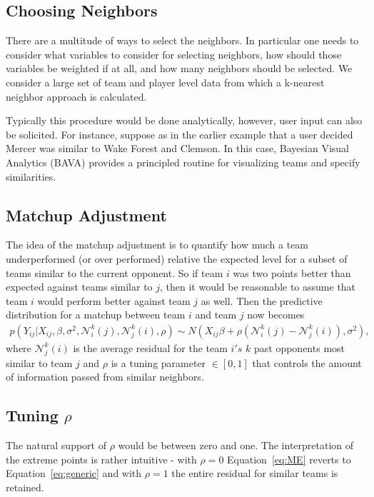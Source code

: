 \subsection{Choosing Neighbors}
There are a multitude of ways to select the neighbors.  In particular one needs to consider what variables to consider for selecting neighbors, how should those variables be weighted if at all, and how many neighbors should be selected.  We consider a large set of team and player level data from which a k-nearest neighbor approach is calculated.

Typically this procedure would be done analytically, however, user input can also be solicited.  For instance, suppose as in the earlier example that a user decided Mercer was similar to Wake Forest and Clemson.  In this case, Bayesian Visual Analytics (BAVA) provides a principled routine for visualizing teams and specify similarities.
\subsection{Matchup Adjustment}
The idea of the matchup adjustment is to quantify how much a team underperformed (or over performed) relative the expected level for a subset of teams similar to the current opponent.  So if team $i$ was two points better than expected against teams similar to $j$, then it would be reasonable to assume that team $i$ would perform better against team $j$ as well.  Then the predictive distribution for a matchup between team $i$ and team $j$ now becomes
\begin{eqnarray}
p(Y_{ij}|X_{ij}, \beta,\sigma^2,\mathcal{N}_i^k(j),\mathcal{N}_j^k(i), \rho) \sim N(X_{ij} \beta + \rho(\mathcal{N}_i^k(j) -\mathcal{N}_j^k(i)), \sigma^2),
\label{eq:ME}
\end{eqnarray}
where $\mathcal{N}_j^k(i)$ is the average residual for the team $i's$ $k$ past opponents most similar to team $j$ and $\rho$ is a tuning parameter $\in [0,1]$ that controls the amount of information passed from similar neighbors. 
\subsection{Tuning $\rho$}
The natural support of $\rho$ would be between zero and one.  The interpretation of the extreme points is rather intuitive - with $\rho = 0$ Equation~\ref{eq:ME} reverts to Equation~\ref{eq:generic} and with $\rho = 1$ the entire residual for similar teams is retained.

